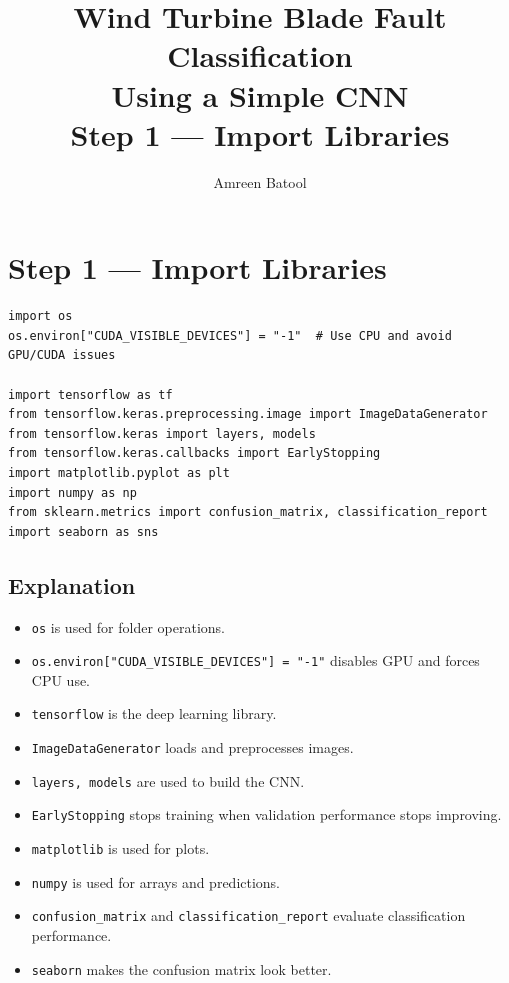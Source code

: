 \documentclass[12pt]{article}
\title{\textbf{Wind Turbine Blade Fault Classification\\Using a Simple CNN}\\[0.5em]
\large Step 1 --- Import Libraries}
\author{Amreen Batool}
\date{}
\begin{document}
\maketitle

\section*{Step 1 --- Import Libraries}

\begin{lstlisting}[style=pythonstyle]
import os
os.environ["CUDA_VISIBLE_DEVICES"] = "-1"  # Use CPU and avoid GPU/CUDA issues

import tensorflow as tf
from tensorflow.keras.preprocessing.image import ImageDataGenerator
from tensorflow.keras import layers, models
from tensorflow.keras.callbacks import EarlyStopping
import matplotlib.pyplot as plt
import numpy as np
from sklearn.metrics import confusion_matrix, classification_report
import seaborn as sns
\end{lstlisting}

\subsection*{Explanation}

\begin{itemize}
    \item \texttt{os} is used for folder operations.
    \item \texttt{os.environ["CUDA\_VISIBLE\_DEVICES"] = "-1"} disables GPU and forces CPU use.
    \item \texttt{tensorflow} is the deep learning library.
    \item \texttt{ImageDataGenerator} loads and preprocesses images.
    \item \texttt{layers, models} are used to build the CNN.
    \item \texttt{EarlyStopping} stops training when validation performance stops improving.
    \item \texttt{matplotlib} is used for plots.
    \item \texttt{numpy} is used for arrays and predictions.
    \item \texttt{confusion\_matrix} and \texttt{classification\_report} evaluate classification performance.
    \item \texttt{seaborn} makes the confusion matrix look better.
\end{itemize}
\end{document}
